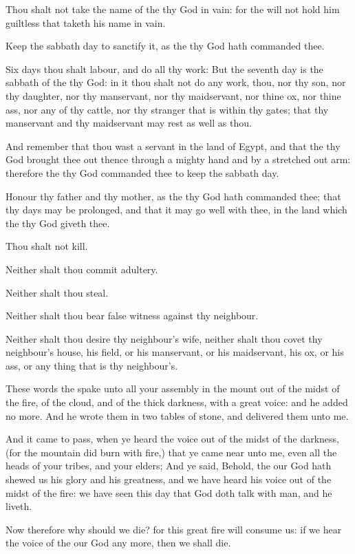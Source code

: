 \Verse Thou shalt not take the name of the \LORD thy God in vain: for the \LORD will not hold him guiltless that taketh his name in vain.

\Verse Keep the sabbath day to sanctify it, as the \LORD thy God hath commanded thee.

\Verse Six days thou shalt labour, and do all thy work: \Verse But the seventh day is the sabbath of the \LORD thy God: in it thou shalt not do any work, thou, nor thy son, nor thy daughter, nor thy manservant, nor thy maidservant, nor thine ox, nor thine ass, nor any of thy cattle, nor thy stranger that is within thy gates; that thy manservant and thy maidservant may rest as well as thou.

\Verse And remember that thou wast a servant in the land of Egypt, and that the \LORD thy God brought thee out thence through a mighty hand and by a stretched out arm: therefore the \LORD thy God commanded thee to keep the sabbath day.

\Verse Honour thy father and thy mother, as the \LORD thy God hath commanded thee; that thy days may be prolonged, and that it may go well with thee, in the land which the \LORD thy God giveth thee.

\Verse Thou shalt not kill.

\Verse Neither shalt thou commit adultery.

\Verse Neither shalt thou steal.

\Verse Neither shalt thou bear false witness against thy neighbour.

\Verse Neither shalt thou desire thy neighbour's wife, neither shalt thou covet thy neighbour's house, his field, or his manservant, or his maidservant, his ox, or his ass, or any thing that is thy neighbour's.

\Verse These words the \LORD spake unto all your assembly in the mount out of the midst of the fire, of the cloud, and of the thick darkness, with a great voice: and he added no more. And he wrote them in two tables of stone, and delivered them unto me.

\Verse And it came to pass, when ye heard the voice out of the midst of the darkness, (for the mountain did burn with fire,) that ye came near unto me, even all the heads of your tribes, and your elders; \Verse And ye said, Behold, the \LORD our God hath shewed us his glory and his greatness, and we have heard his voice out of the midst of the fire: we have seen this day that God doth talk with man, and he liveth.

\Verse Now therefore why should we die? for this great fire will consume us: if we hear the voice of the \LORD our God any more, then we shall die.

